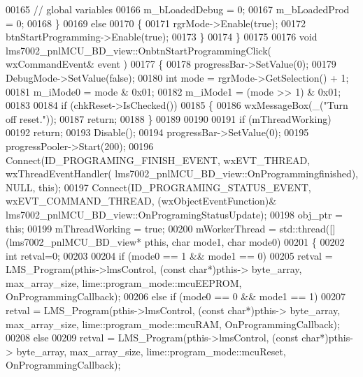 \begin{DoxyCode}
{00165         \textcolor{comment}{// global variables}
00166         m_bLoadedDebug = 0;
00167         m_bLoadedProd = 0;
00168     \}
00169     \textcolor{keywordflow}{else}
00170     \{
00171         rgrMode->Enable(\textcolor{keyword}{true});
00172         btnStartProgramming->Enable(\textcolor{keyword}{true});
00173     \}
00174 \}
00175 
00176 \textcolor{keywordtype}{void} lms7002_pnlMCU_BD_view::OnbtnStartProgrammingClick( wxCommandEvent& event )
00177 \{
00178     progressBar->SetValue(0);
00179     DebugMode->SetValue(\textcolor{keyword}{false});
00180     \textcolor{keywordtype}{int} mode = rgrMode->GetSelection() + 1;
00181     m_iMode0 = mode & 0x01;
00182     m_iMode1 = (mode >> 1) & 0x01;
00183 
00184     \textcolor{keywordflow}{if} (chkReset->IsChecked())
00185     \{
00186         wxMessageBox(\_(\textcolor{stringliteral}{"Turn off reset."}));
00187         \textcolor{keywordflow}{return};
00188     \}
00189 
00190 
00191     \textcolor{keywordflow}{if} (mThreadWorking)
00192         \textcolor{keywordflow}{return};
00193     Disable();
00194     progressBar->SetValue(0);
00195     progressPooler->Start(200);
00196     Connect(ID_PROGRAMING_FINISH_EVENT, wxEVT\_THREAD, wxThreadEventHandler(
      lms7002_pnlMCU_BD_view::OnProgrammingfinished), NULL, \textcolor{keyword}{this});
00197     Connect(ID_PROGRAMING_STATUS_EVENT, wxEVT\_COMMAND\_THREAD, (wxObjectEventFunction)&
      lms7002_pnlMCU_BD_view::OnProgramingStatusUpdate);
00198     obj_ptr = \textcolor{keyword}{this};
00199     mThreadWorking = \textcolor{keyword}{true};
00200     mWorkerThread = std::thread([](lms7002_pnlMCU_BD_view* pthis, \textcolor{keywordtype}{char} mode1, \textcolor{keywordtype}{char} mode0)
00201     \{
00202         \textcolor{keywordtype}{int} retval=0;
00203 
00204         \textcolor{keywordflow}{if} (mode0 == 1 && mode1 == 0)
00205             retval = LMS_Program(pthis->lmsControl, (\textcolor{keyword}{const} \textcolor{keywordtype}{char}*)pthis->
      byte_array, max_array_size, lime::program_mode::mcuEEPROM, OnProgrammingCallback);
00206         \textcolor{keywordflow}{else} if (mode0 == 0 && mode1 == 1)
00207             retval = LMS_Program(pthis->lmsControl, (\textcolor{keyword}{const} \textcolor{keywordtype}{char}*)pthis->
      byte_array, max_array_size, lime::program_mode::mcuRAM, OnProgrammingCallback);
00208         \textcolor{keywordflow}{else}
00209             retval = LMS_Program(pthis->lmsControl, (\textcolor{keyword}{const} \textcolor{keywordtype}{char}*)pthis->
      byte_array, max_array_size, lime::program_mode::mcuReset, OnProgrammingCallback);
}
\end{DoxyCode}
